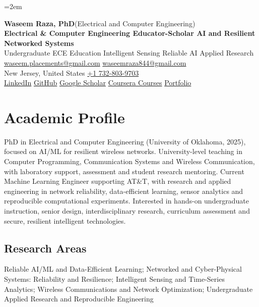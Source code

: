 \documentclass[8pt,letterpaper]{extarticle}
\begin{document}
\emergencystretch=2em
\begin{center}
{\LARGE\bfseries Waseem Raza, PhD}{\normalsize\mdseries \enspace (Electrical and Computer Engineering)}\\[2pt]
{\large\bfseries Electrical \& Computer Engineering Educator-Scholar \textbar{} AI and Resilient Networked Systems}\\[1pt]
{\small Undergraduate ECE Education \textbar{} Intelligent Sensing \textbar{} Reliable AI \textbar{} Applied Research}\\[3pt]
{\footnotesize {}\enspace \href{mailto:waseem.placements@gmail.com}{waseem.placements@gmail.com} \textbar{} \href{mailto:waseemraza844@gmail.com}{waseemraza844@gmail.com}\\[1pt]New Jersey, United States \quad {}\enspace \href{tel:+17328039703}{+1 732-803-9703}\\[1pt]\href{https://www.linkedin.com/in/waseem-raza-phd-9a737858/}{LinkedIn} \textbar{} \href{https://github.com/WaseemRaza844}{GitHub} \textbar{} \href{https://scholar.google.com/citations?user=d58Drr0AAAAJ\&hl=en}{Google Scholar} \textbar{} \href{https://waseemraza844.github.io/portfolio/learning.html}{Coursera Courses} \textbar{} \href{https://waseemraza844.github.io/portfolio/}{Portfolio}}
\end{center}
\vspace{-5pt}
\section{Academic Profile}
PhD in Electrical and Computer Engineering (University of Oklahoma, 2025), focused on AI/ML for resilient wireless networks. University-level teaching in Computer Programming, Communication Systems and Wireless Communication, with laboratory support, assessment and student research mentoring. Current Machine Learning Engineer supporting AT\&T, with research and applied engineering in network reliability, data-efficient learning, sensor analytics and reproducible computational experiments. Interested in hands-on undergraduate instruction, senior design, interdisciplinary research, curriculum assessment and secure, resilient intelligent technologies.
\subsection{Research Areas}
Reliable AI/ML and Data-Efficient Learning; Networked and Cyber-Physical Systems: Reliability and Resilience; Intelligent Sensing and Time-Series Analytics; Wireless Communications and Network Optimization; Undergraduate Applied Research and Reproducible Engineering\par
{}
\end{document}
